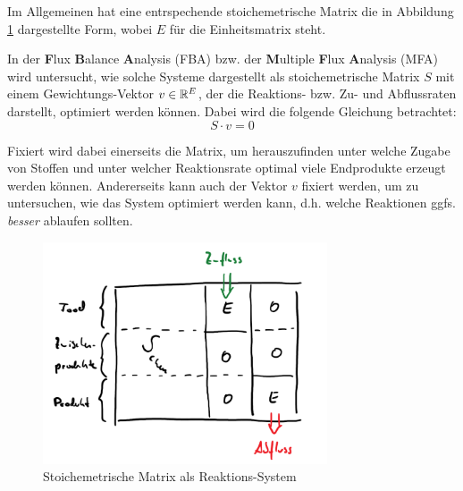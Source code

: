 \begin{remark}
    Im Allgemeinen hat eine entrspechende stoichemetrische Matrix die in Abbildung \ref{fig:stoich} dargestellte Form, wobei $ E $ für die Einheitsmatrix steht.

    In der \textbf{F}lux \textbf{B}alance \textbf{A}nalysis (FBA) bzw. der \textbf{M}ultiple \textbf{F}lux \textbf{A}nalysis (MFA) wird untersucht, wie solche Systeme dargestellt als stoichemetrische Matrix $ S $ mit einem Gewichtungs-Vektor $ v \in \mathbb{R}^E $, der die Reaktions- bzw. Zu- und Abflussraten darstellt, optimiert werden können.
    Dabei wird die folgende Gleichung betrachtet:
    \begin{equation*}
        S \cdot v = 0
    \end{equation*}

    Fixiert wird dabei einerseits die Matrix, um herauszufinden unter welche Zugabe von Stoffen und unter welcher Reaktionsrate optimal viele Endprodukte erzeugt werden können.
    Andererseits kann auch der Vektor $ v $ fixiert werden, um zu untersuchen, wie das System optimiert werden kann, d.h. welche Reaktionen ggfs. \textit{besser} ablaufen sollten.

    \begin{figure}
        \centering
        \includegraphics[width=0.75\textwidth]{figures/stoichiometrisch.png}
        \caption{Stoichemetrische Matrix als Reaktions-System}
        \label{fig:stoich}
    \end{figure}
\end{remark}
